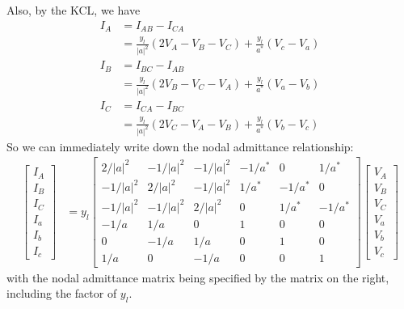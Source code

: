 \documentclass[11pt]{article}
\begin{document}
Also, by the KCL, we have
\begin{align}
I_A &= I_{AB} - I_{CA} \\
&= \frac{y_l}{|a|^2}(2V_A - V_B - V_C) + \frac{y_l}{a^*}(V_c - V_a) \\
I_B &= I_{BC} - I_{AB} \\
&= \frac{y_l}{|a|^2}(2V_B - V_C - V_A) + \frac{y_l}{a^*}(V_a - V_b) \\
I_C &= I_{CA} - I_{BC} \\
&= \frac{y_l}{|a|^2}(2V_C - V_A - V_B) + \frac{y_l}{a^*}(V_b - V_c)
\end{align}
So we can immediately write down the nodal admittance relationship:
\begin{align}
\begin{bmatrix}I_A \\ I_B \\ I_C \\ I_a \\ I_b \\ I_c\end{bmatrix} &=
y_l \begin{bmatrix}
	2/|a|^2 & -1/|a|^2 & -1/|a|^2 & -1/a^* & 0 & 1/a^* \\
	-1/|a|^2 & 2/|a|^2 &  -1/|a|^2 & 1/a^*  & -1/a^* & 0 \\
	-1/|a|^2 &  -1/|a|^2 & 2/|a|^2 & 0 & 1/a^*  & -1/a^* \\
	-1/a & 1/a & 0 & 1 & 0 & 0 \\
	0 & -1/a & 1/a & 0 & 1 & 0 \\
	1/a & 0 & -1/a & 0 & 0 & 1
\end{bmatrix}
\begin{bmatrix}V_A \\ V_B \\ V_C \\ V_a \\ V_b \\ V_c\end{bmatrix}
\end{align}
with the nodal admittance matrix being specified by the matrix on the right, including the factor of $y_l$.
\end{document}
